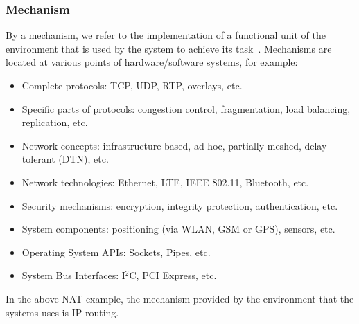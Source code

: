 \subsubsection{Mechanism}
By a mechanism, we refer to the implementation of a functional unit of the environment that is used by the system to achieve its task~\cite{frommgen2016mechanism}.
Mechanisms are located at various points of hardware/software systems, for example:
%
\begin{itemize}
 \item Complete protocols: TCP, UDP, RTP, overlays, etc.
 \item Specific parts of protocols: congestion control, fragmentation, load balancing, replication, etc.
 \item Network concepts: infrastructure-based, ad-hoc, partially meshed, delay tolerant (DTN), etc.
 \item Network technologies: Ethernet, LTE, IEEE 802.11, Bluetooth, etc.
 \item Security mechanisms: encryption, integrity protection, authentication, etc.
 \item System components: positioning (via WLAN, GSM or GPS), sensors, etc.
 \item Operating System APIs: Sockets, Pipes, etc.
 \item System Bus Interfaces: I$^2$C, PCI Express, etc.
\end{itemize}
%
In the above NAT example, the mechanism provided by the environment that the systems uses is IP routing.


